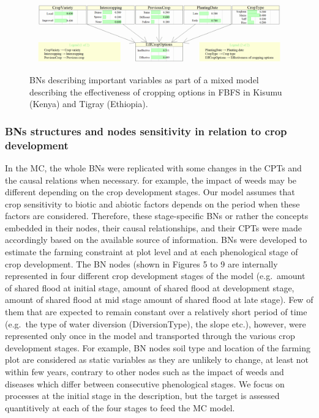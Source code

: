 \documentclass[12pt,oneside]{article}
\begin{document}
\begin{figure}[!htbp]

{\centering \includegraphics[width=1\linewidth,]{figures/Modelling_FBFS_Suppl_Effectiveness_of_cropping_options_BNs_plot} 

}

\caption{BNs describing important variables as part of a mixed model describing the effectiveness of cropping options in FBFS in Kisumu (Kenya) and Tigray (Ethiopia).}\label{fig:fig6}
\end{figure}

\hypertarget{I15}{%
\subsubsection{BNs structures and nodes sensitivity in relation to crop development}\label{I15}}

In the MC, the whole BNs were replicated with some changes in the CPTs and the causal relations when necessary. for example, the impact of weeds may be different depending on the crop development stages. Our model assumes that crop sensitivity to biotic and abiotic factors depends on the period when these factors are considered. Therefore, these stage-specific BNs or rather the concepts embedded in their nodes, their causal relationships, and their CPTs were made accordingly based on the available source of information. BNs were developed to estimate the farming constraint at plot level and at each phenological stage of crop development. The BN nodes (shown in Figures 5 to 9 are internally represented in four different crop development stages of the model (e.g.~amount of shared flood at initial stage, amount of shared flood at development stage, amount of shared flood at mid stage amount of shared flood at late stage). Few of them that are expected to remain constant over a relatively short period of time (e.g.~the type of water diversion (DiversionType), the slope etc.), however, were represented only once in the model and transported through the various crop development stages. For example, BN nodes soil type and location of the farming plot are considered as static variables as they are unlikely to change, at least not within few years, contrary to other nodes such as the impact of weeds and diseases which differ between consecutive phenological stages. We focus on processes at the initial stage in the description, but the target is assessed quantitively at each of the four stages to feed the MC model.
\end{document}
